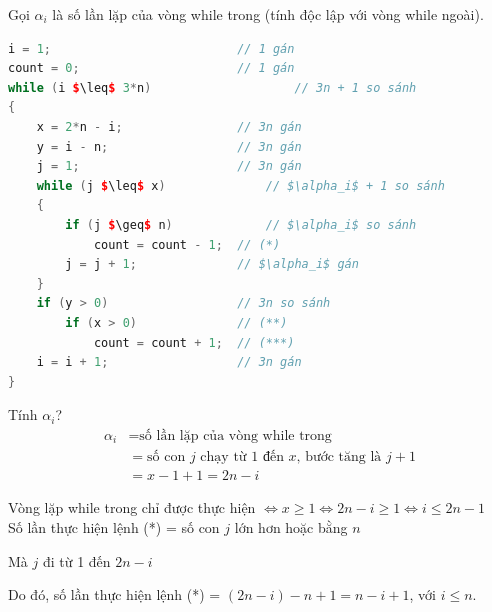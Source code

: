 \documentclass[12pt, a4paper, fleqn]{article}
\begin{document}
	Gọi $\alpha_i$ là số lần lặp của vòng while trong (tính độc lập với vòng while ngoài).
	
	\begin{lstlisting}[language = C++, mathescape, texcl]
i = 1;							// 1 gán
count = 0;						// 1 gán
while (i $\leq$ 3*n)					// 3n + 1 so sánh
{
	x = 2*n - i;				// 3n gán
	y = i - n;					// 3n gán
	j = 1;						// 3n gán
	while (j $\leq$ x)				// $\alpha_i$ + 1 so sánh
	{
		if (j $\geq$ n)				// $\alpha_i$ so sánh
			count = count - 1;	// (*)
		j = j + 1;				// $\alpha_i$ gán
	}
	if (y > 0)					// 3n so sánh
		if (x > 0)				// (**)
			count = count + 1;	// (***)
	i = i + 1;					// 3n gán
}
	\end{lstlisting}
	
	Tính $\alpha_i$?
	\begin{align*}
		\alpha_i &= \text{số lần lặp của vòng while trong} \\
				 &= \text{số con $j$ chạy từ 1 đến $x$, bước tăng là $j + 1$} \\
				 &= x - 1 + 1 = 2n - i
	\end{align*}
	
	Vòng lặp while trong chỉ được thực hiện $\Leftrightarrow x \geq 1 \Leftrightarrow 2n - i \geq 1 \Leftrightarrow i \leq 2n - 1$ \\

	Số lần thực hiện lệnh (*) = số con $j$ lớn hơn hoặc bằng $n$
	
	Mà $j$ đi từ 1 đến $2n - i$
	
	Do đó, số lần thực hiện lệnh (*) = $(2n - i) - n + 1 = n - i + 1$, với $i \leq n$.
	
\end{document}
